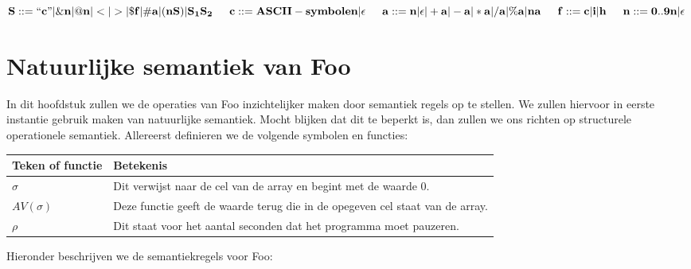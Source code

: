 \documentclass[11pt]{article}
\begin{document}
\begin{math}
{\bf S::= ``c" | \&n | @n | < | > | \$f | \#a | (nS) | S_{1}S_{2} }
\newline
\newline
\indent{\bf c::= ASCII-symbolen| \epsilon}
\newline
\indent{\bf a::= n | \epsilon | +a | -a | *a | /a | \%a | na}
\newline 
\indent{\bf f::= c | i | h}
\newline
\indent{\bf n::= 0..9n | \epsilon}
\end{math}





\section{Natuurlijke semantiek van Foo}
In dit hoofdstuk zullen we de operaties van Foo inzichtelijker maken door semantiek regels op te stellen. 
We zullen hiervoor in eerste instantie gebruik maken van natuurlijke semantiek.
Mocht blijken dat dit te beperkt is, dan zullen we ons richten op structurele operationele semantiek.
Allereerst definieren we de volgende symbolen en functies:
\newline
\newline
\begin{tabular}{ | l | p{12cm} |}
    \hline
    Teken of functie & Betekenis \\ \hline
    \begin{math} \sigma \end{math} &  Dit verwijst naar de cel van de array en begint met de waarde 0. \\ \hline
    \begin{math} AV(\sigma) \end{math} & Deze functie geeft de waarde terug die in de opegeven cel staat van de array. \\ \hline
    \begin{math} \rho \end{math} &  Dit staat voor het aantal seconden dat het programma moet pauzeren. \\ \hline

\end{tabular}
\newline
\newline
\newline
Hieronder beschrijven we de semantiekregels voor Foo:
\newline
\end{document}
